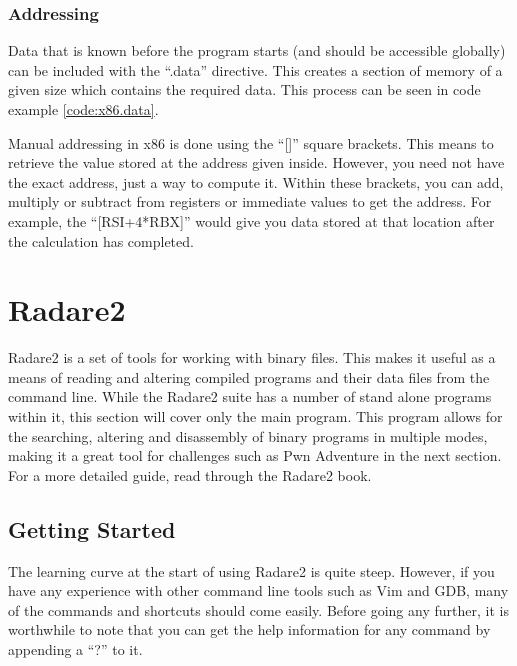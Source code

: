 			\subsubsection{Addressing}
				Data that is known before the program starts (and should be accessible globally) can be included with the ``.data'' directive. 
				This creates a section of memory of a given size which contains the required data. 
				This process can be seen in code example \ref{code:x86.data}. 
				\begin{code}
					Assembler}]{./x86.data}
					\caption{Using the .data Section of x86 Assembly}
					\label{code:x86.data}
				\end{code}

				Manual addressing in x86 is done using the ``[]'' square brackets. 
				This means to retrieve the value stored at the address given inside. 
				However, you need not have the exact address, just a way to compute it. 
				Within these brackets, you can add, multiply or subtract from registers or immediate values to get the address. 
				For example, the ``[RSI+4*RBX]'' would give you data stored at that location after the calculation has completed. 


	\section{Radare2}
		Radare2 is a set of tools for working with binary files. 
		This makes it useful as a means of reading and altering compiled programs and their data files from the command line. 
		While the Radare2 suite has a number of stand alone programs within it, this section will cover only the main program. 
		This program allows for the searching, altering and disassembly of binary programs in multiple modes, making it a great tool for challenges such as Pwn Adventure in the next section.
		For a more detailed guide, read through the Radare2 book.\cite{Radare2}

		\subsection{Getting Started}
			The learning curve at the start of using Radare2 is quite steep. 
			However, if you have any experience with other command line tools such as Vim and GDB, many of the commands and shortcuts should come easily. 
			Before going any further, it is worthwhile to note that you can get the help information for any command by appending a ``?'' to it. 

